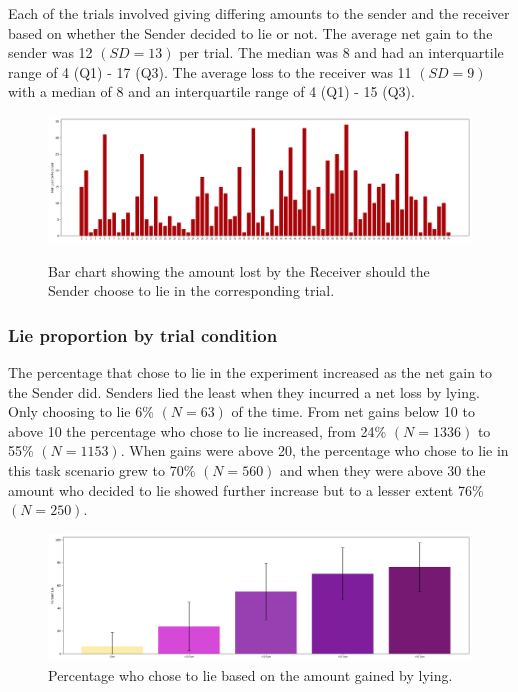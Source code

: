 \documentclass[man, floatsintext]{apa7}
\begin{document}
Each of the trials involved giving differing amounts to the sender and the receiver based on whether the Sender decided to lie or not. The average net gain to the sender was 12 $(SD = 13)$ per trial. The median was 8 and had an interquartile range of 4 (Q1) - 17 (Q3). The average loss to the receiver was 11 $(SD = 9)$ with a median of 8 and an interquartile range of 4 (Q1) - 15 (Q3).

\begin{figure}[H]
	\caption{Bar chart showing the amount lost by the Receiver should the Sender choose to lie in the corresponding trial.}
	\includegraphics[width=\linewidth]{../plots/TrialIndex/Losses.png}
	\label{fig:Losses}
\end{figure}

\subsubsection{Lie proportion by trial condition}

The percentage that chose to lie in the experiment increased as the net gain to the Sender did.  Senders lied the least when they incurred a net loss by lying. Only choosing to lie 6\% $(N = 63)$ of the time. From net gains below 10 to above 10 the percentage who chose to lie increased, from 24\% $(N = 1336)$ to 55\% $(N = 1153)$. When gains were above 20, the percentage who chose to lie in this task scenario grew to 70\% $(N = 560)$ and when they were above 30 the amount who decided to lie showed further increase but to a lesser extent 76\% $(N = 250)$.

\begin{figure}[H]
	\includegraphics[width=\linewidth]{../plots/RESPONSE/NetGainLie.png}
	\caption{Percentage who chose to lie based on the amount gained by lying.}
	\label{fig:NetGainLie}
\end{figure}
\end{document}
